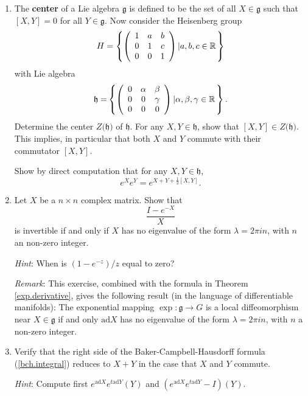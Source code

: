 \documentclass[12pt]{amsbook}
\let \frak = \mathfrak
\theoremstyle{plain}
\numberwithin{equation}{chapter}
\numberwithin{theorem}{chapter}
\begin{document}
\begin{enumerate}
\item \label{bch.special}The \textbf{center} of a Lie algebra $\frak{g}$ is
defined to be the set of all $X\in\frak{g}$ such that $\left[  X,Y\right]  =0$
for all $Y\in\frak{g}$. Now consider the Heisenberg group
\[
H=\left\{  \left(
\begin{array}
[c]{ccc}%
1 & a & b\\
0 & 1 & c\\
0 & 0 & 1
\end{array}
\right)  \left|  a,b,c\in\mathbb{R}\right.  \right\}
\]
with Lie algebra
\[
\frak{h=}\left\{  \left(
\begin{array}
[c]{ccc}%
0 & \alpha & \beta\\
0 & 0 & \gamma\\
0 & 0 & 0
\end{array}
\right)  \left|  \alpha,\beta,\gamma\in\mathbb{R}\right.  \right\}  \text{.}%
\]
Determine the center $Z(\frak{h)}$ of $\frak{h}$. For any $X,Y\in\frak{h}$,
show that $[X,Y]\in Z(\frak{h)}$. This implies, in particular that both $X$
and $Y$ commute with their commutator $[X,Y]$.

Show by direct computation that for any $X,Y\in\frak{h}$,
\begin{equation}
e^{X}e^{Y}=e^{X+Y+\tfrac{1}{2}[X,Y]}\text{.}\label{terminate}%
\end{equation}

\item  Let $X$ be a $n\times n$ complex matrix. Show that
\[
\frac{I-e^{-X}}{X}%
\]
is invertible if and only if $X$ has no eigenvalue of the form $\lambda=2\pi
in$, with $n$ an non-zero integer.

\textit{Hint}: When is $\left(  1-e^{-z}\right)  /z$ equal to zero?

\textit{Remark}: This exercise, combined with the formula in Theorem
\ref{exp.derivative}, gives the following result (in the language of
differentiable manifolds): The exponential mapping $\exp:\frak{g}\rightarrow
G$ is a local diffeomorphism near $X\in\frak{g}$ if and only $\mathrm{ad}X$
has no eigenvalue of the form $\lambda=2\pi in$, with $n$ a non-zero integer.

\item \label{bch.commute}Verify that the right side of the
Baker-Campbell-Hausdorff formula (\ref{bch.integral}) reduces to $X+Y$ in the
case that $X$ and $Y$ commute.

\textit{Hint}: Compute first $e^{\mathrm{ad}X}e^{t\mathrm{ad}Y}(Y)$ and
$\left(  e^{\mathrm{ad}X}e^{t\mathrm{ad}Y}-I\right)  (Y)$.


\end{enumerate}
\end{document}

